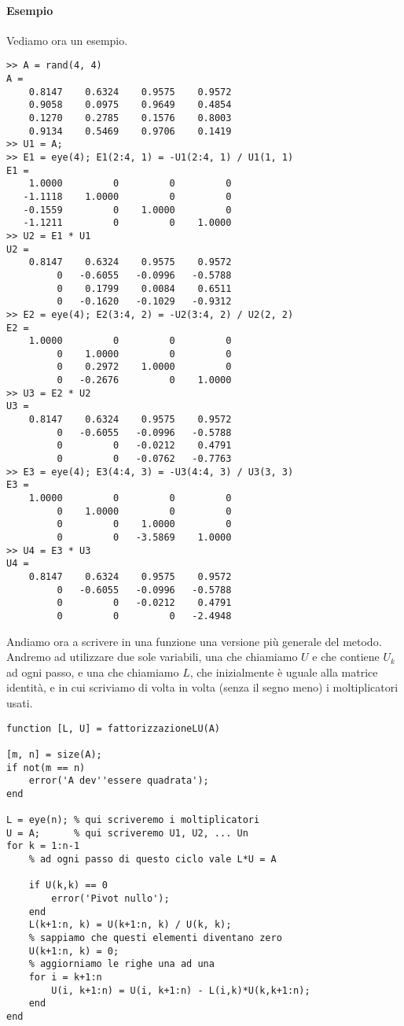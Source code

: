 \documentclass[a4paper]{report}
\theoremstyle{definiton}
\theoremstyle{remark}
\begin{document}
\paragraph{Esempio} Vediamo ora un esempio.
\begin{lstlisting}
>> A = rand(4, 4)
A =
    0.8147    0.6324    0.9575    0.9572
    0.9058    0.0975    0.9649    0.4854
    0.1270    0.2785    0.1576    0.8003
    0.9134    0.5469    0.9706    0.1419
>> U1 = A;
>> E1 = eye(4); E1(2:4, 1) = -U1(2:4, 1) / U1(1, 1)
E1 =
    1.0000         0         0         0
   -1.1118    1.0000         0         0
   -0.1559         0    1.0000         0
   -1.1211         0         0    1.0000
>> U2 = E1 * U1
U2 =
    0.8147    0.6324    0.9575    0.9572
         0   -0.6055   -0.0996   -0.5788
         0    0.1799    0.0084    0.6511
         0   -0.1620   -0.1029   -0.9312
>> E2 = eye(4); E2(3:4, 2) = -U2(3:4, 2) / U2(2, 2)
E2 =
    1.0000         0         0         0
         0    1.0000         0         0
         0    0.2972    1.0000         0
         0   -0.2676         0    1.0000
>> U3 = E2 * U2
U3 =
    0.8147    0.6324    0.9575    0.9572
         0   -0.6055   -0.0996   -0.5788
         0         0   -0.0212    0.4791
         0         0   -0.0762   -0.7763
>> E3 = eye(4); E3(4:4, 3) = -U3(4:4, 3) / U3(3, 3)
E3 =
    1.0000         0         0         0
         0    1.0000         0         0
         0         0    1.0000         0
         0         0   -3.5869    1.0000
>> U4 = E3 * U3
U4 =
    0.8147    0.6324    0.9575    0.9572
         0   -0.6055   -0.0996   -0.5788
         0         0   -0.0212    0.4791
         0         0         0   -2.4948
\end{lstlisting}
Andiamo ora a scrivere in una funzione una versione più generale del metodo. Andremo ad utilizzare due sole variabili, una che chiamiamo $U$ e che contiene $U_k$ ad ogni passo, e una che chiamiamo $L$, che inizialmente è uguale alla matrice identità, e in cui scriviamo di volta in volta (senza il segno meno) i moltiplicatori usati.
\begin{lstlisting}
function [L, U] = fattorizzazioneLU(A)

[m, n] = size(A);
if not(m == n)
    error('A dev''essere quadrata');
end

L = eye(n); % qui scriveremo i moltiplicatori
U = A;      % qui scriveremo U1, U2, ... Un
for k = 1:n-1
    % ad ogni passo di questo ciclo vale L*U = A

    if U(k,k) == 0
        error('Pivot nullo');
    end
    L(k+1:n, k) = U(k+1:n, k) / U(k, k);
    % sappiamo che questi elementi diventano zero
    U(k+1:n, k) = 0;
    % aggiorniamo le righe una ad una
    for i = k+1:n
        U(i, k+1:n) = U(i, k+1:n) - L(i,k)*U(k,k+1:n);
    end
end
\end{lstlisting}
\end{document}
